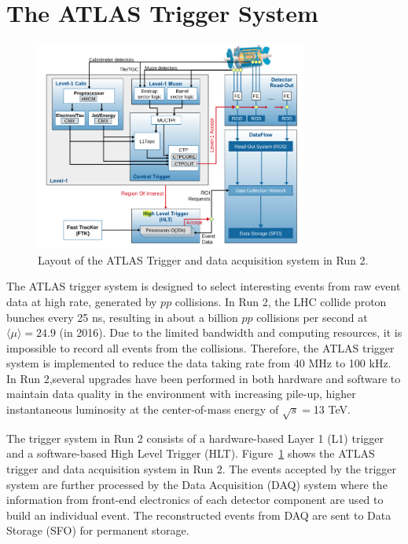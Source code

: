 \section{The ATLAS Trigger System}
\label{sec:atlas:daq}

\begin{figure}[!htb]
    \includegraphics[width=0.8\textwidth]{figures/tdaq.png}
    \centering
    \caption{Layout of the ATLAS Trigger and data acquisition system in Run 2.}
    \label{fig:tdaq}
\end{figure}

The ATLAS trigger system is designed to select interesting events from raw event data at high rate, generated by $pp$ collisions. In Run 2, the LHC collide proton bunches every 25 \si{\nano\second}, resulting in about a billion $pp$ collisions per second at $\langle\mu\rangle = 24.9$ (in 2016). Due to the limited bandwidth and computing resources, it is impossible to record all events from the collisions. Therefore, the ATLAS trigger system is implemented to reduce the data taking rate from 40 \si{\mega\hertz} to 100 \si{\kilo\hertz}. In Run 2,several upgrades have been performed in both hardware and software to maintain data quality in the environment with increasing pile-up, higher instantaneous luminosity at the center-of-mass energy of $\sqrt{s}=$13 TeV.

The trigger system in Run 2 consists of a hardware-based Layer 1 (L1) trigger and a software-based High Level Trigger (HLT). Figure~\ref{fig:tdaq} shows the ATLAS trigger and data acquisition system in Run 2. The events accepted by the trigger system are further processed by the Data Acquisition (DAQ) system where the information from front-end electronics of each detector component are used to build an individual event. The reconstructed events from DAQ are sent to Data Storage (SFO) for permanent storage.



